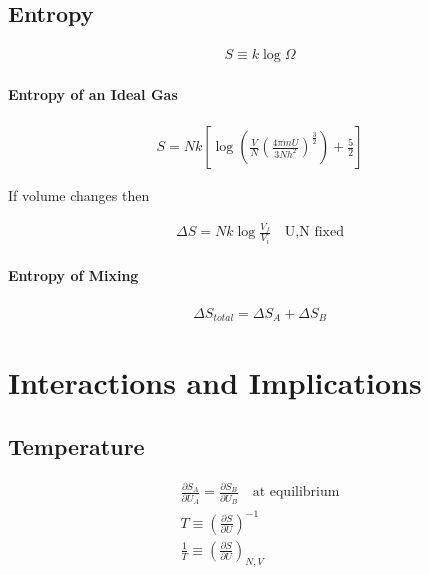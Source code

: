 \documentclass[10pt]{article}
\begin{document}
\subsection{Entropy}%
\label{sub:entropy}

\begin{align}
S\equiv k\log\Omega
\end{align}

\paragraph{Entropy of an Ideal Gas}%
\label{par:entropy_of_an_ideal_gas}

\begin{align}
  S=Nk\left[\log\left(\frac{V}{N}\left(\frac{4\pi
  mU}{3Nh^2}\right)^{\frac{3}{2}}\right)+\frac{5}{2}\right]
\end{align}

If volume changes then

\begin{align}
  \Delta S=Nk\log\frac{V_f}{V_i}\quad\text{U,N fixed}
\end{align}

\paragraph{Entropy of Mixing}%
\label{par:entropy_of_mixing}

\begin{align}
  \Delta S_{total}=\Delta S_{A}+\Delta S_{B}
\end{align}

\section{Interactions and Implications}%
\label{sec:interactions_and_implications}

\subsection{Temperature}%
\label{sub:temperature}

\begin{align}
  \frac{\partial S_A}{\partial U_A}=\frac{\partial S_B}{\partial U_B}\quad
  \text{at equilibrium}\\
  T\equiv \left(\frac{\partial S}{\partial U}\right)^{-1}\\
  \frac{1}{T} \equiv\left(\frac{\partial S}{\partial U}\right)_{N,V}
\end{align}
\end{document}
